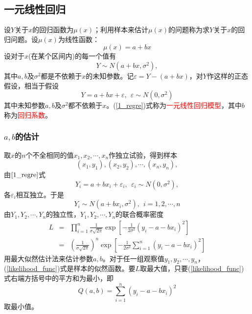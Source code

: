 \documentclass[12pt,a4paper]{article}
\begin{document}
\subsection{一元线性回归}
设$Y$关于$x$的回归函数为$\mu(x)$；利用样本来估计$\mu(x)$的问题称为求$Y$关于$x$的回归问题。设$\mu(x)$为线性函数：
\begin{equation}
\mu(x) = a+bx
\end{equation}
设对于$x$(在某个区间内)的每一个值有
\begin{equation}
Y \sim N(a+bx, \sigma^2) ,
\end{equation}
其中$a, b$及$\sigma^2$都是不依赖于$x$的未知参数。记$\varepsilon = Y -(a+bx)$，对$Y$作这样的正态假设，相当于假设
\begin{equation}
Y = a +bx +\varepsilon, ~~ \varepsilon \sim N(0, \sigma^2)
\label{1_regre}
\end{equation}
其中未知参数$a, b$及$\sigma^2$都不依赖于$x$。(\ref{1_regre})式称为\textcolor{red}{一元线性回归模型}，其中$b$称为\textcolor{red}{回归系数}。

\subsubsection{$a, b$的估计}
取$x$的$n$个不全相同的值$x_1, x_2, \cdots, x_n$作独立试验，得到样本
\begin{equation}
(x_1, y_1), (x_2, y_2), \cdots, (x_n, y_n) ,
\end{equation}
由$\ref{1_regre}$式
\begin{equation}
Y_i = a +bx_i +\varepsilon_i, ~~ \varepsilon_i \sim N(0, \sigma^2), 
\end{equation}
各$\varepsilon_i$相互独立。于是
\begin{equation}
Y_i \sim  N(a+bx_i, \sigma^2), ~~ i = 1, 2, \cdots, n
\end{equation}
由$Y_1, Y_2, \cdots, Y_n$的独立性，$Y_1, Y_2, \cdots, Y_n$的联合概率密度
\begin{eqnarray}
\nonumber L  &=& \prod_{i=1}^n \frac{1}{\sigma \sqrt{2\pi}} \exp \left[-\frac{1}{2\sigma^2} (y_i -a -bx_i)^2   \right] \\
&=&  \left( \frac{1}{\sigma \sqrt{2\pi}}  \right)^n \exp \left[-\frac{1}{2\sigma^2} \sum_{i=1}^n (y_i -a -bx_i)^2   \right] 
\label{likelihood_func}
\end{eqnarray}
用最大似然估计法来估计参数$a, b$。对于任一组观察值$y_1, y_2, \cdots, y_n$，(\ref{likelihood_func})式是样本的似然函数。要$L$取最大值，只要(\ref{likelihood_func})式右端方括号中的平方和为最小，即
\begin{equation}
Q(a, b) = \sum_{i=1}^n (y_i -a -bx_i)^2
\label{ls_method}
\end{equation}
取最小值。
\end{document}
